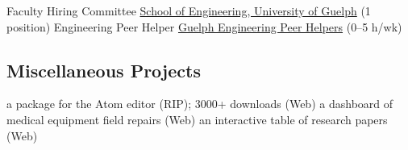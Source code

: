   {Faculty Hiring Committee}
  {\href{https://www.uoguelph.ca/engineering}{School of Engineering, University of Guelph} (1 position)}
  {Engineering Peer Helper}
  {\href{https://www.uoguelph.ca/engineering/content/current/peer-helper}{Guelph Engineering Peer Helpers} (0--5 h/wk)}
\subsection{Miscellaneous Projects}
  {}
  {a package for the Atom editor (RIP); 3000+ downloads (Web)}
  {} %
  {a dashboard of medical equipment field repairs (Web)}
  {}
  {an interactive table of research papers (Web)}

